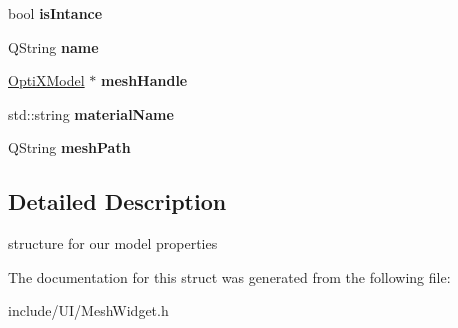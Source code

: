 \begin{DoxyCompactItemize}
\item 
\hypertarget{struct_mesh_widget_1_1model_prop_a6df3a781ee355abfaae4d06061f69651}{bool {\bfseries is\-Intance}}\label{struct_mesh_widget_1_1model_prop_a6df3a781ee355abfaae4d06061f69651}

\item 
\hypertarget{struct_mesh_widget_1_1model_prop_ad57e0324ab4a2f03fa279b672c65dea6}{Q\-String {\bfseries name}}\label{struct_mesh_widget_1_1model_prop_ad57e0324ab4a2f03fa279b672c65dea6}

\item 
\hypertarget{struct_mesh_widget_1_1model_prop_a029fd03da84778154c2465889e4bff81}{\hyperlink{class_opti_x_model}{Opti\-X\-Model} $\ast$ {\bfseries mesh\-Handle}}\label{struct_mesh_widget_1_1model_prop_a029fd03da84778154c2465889e4bff81}

\item 
\hypertarget{struct_mesh_widget_1_1model_prop_a8319aa145cc934305748ca25b9243d22}{std\-::string {\bfseries material\-Name}}\label{struct_mesh_widget_1_1model_prop_a8319aa145cc934305748ca25b9243d22}

\item 
\hypertarget{struct_mesh_widget_1_1model_prop_a82ec014fe561de4d6605e21806d9dbe6}{Q\-String {\bfseries mesh\-Path}}\label{struct_mesh_widget_1_1model_prop_a82ec014fe561de4d6605e21806d9dbe6}

\end{DoxyCompactItemize}


\subsection{Detailed Description}
structure for our model properties 

The documentation for this struct was generated from the following file\-:\begin{DoxyCompactItemize}
\item 
include/\-U\-I/Mesh\-Widget.\-h\end{DoxyCompactItemize}
